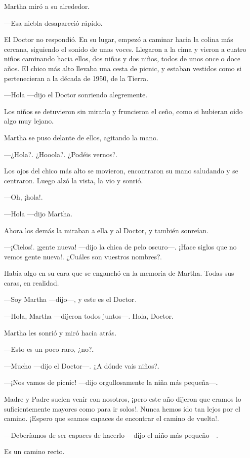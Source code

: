 Martha miró a su alrededor.

---Esa niebla desapareció rápido.

El Doctor no respondió. En su lugar, empezó a caminar hacia la colina más cercana, siguiendo el sonido de unas voces. Llegaron a la cima y vieron a cuatro niños caminando hacia ellos, dos niñas y dos niños, todos de unos once o doce años. El chico más alto llevaba una cesta de picnic, y estaban vestidos como si pertenecieran a la década de 1950, de la Tierra.

---Hola ---dijo el Doctor sonriendo alegremente.

Los niños se detuvieron sin mirarlo y fruncieron el ceño, como si hubieran oído algo muy lejano.

Martha se puso delante de ellos, agitando la mano.

---¿Hola?. ¿Hooola?. ¿Podéis vernos?.

Los ojos del chico más alto se movieron, encontraron su mano saludando y se centraron. Luego alzó la vista, la vio y sonrió.

---Oh, ¡hola!.

---Hola ---dijo Martha.

Ahora los demás la miraban a ella y al Doctor, y también sonreían.

---¡Cielos!. ¡gente nueva! ---dijo la chica de pelo oscuro---. ¡Hace siglos que no vemos gente nueva!. ¿Cuáles son vuestros nombres?.

Había algo en su cara que se enganchó en la memoria de Martha. Todas sus caras, en realidad.

---Soy Martha ---dijo---, y este es el Doctor.

---Hola, Martha ---dijeron todos juntos---. Hola, Doctor.

Martha les sonrió y miró hacia atrás.

---Esto es un poco raro, ¿no?.

---Mucho ---dijo el Doctor---. ¿A dónde vais niños?.

---¡Nos vamos de picnic! ---dijo orgullosamente la niña más pequeña---.

Madre y Padre suelen venir con nosotros, ¡pero este año dijeron que eramos lo suficientemente mayores como para ir solos!. Nunca hemos ido tan lejos por el camino. ¡Espero que seamos capaces de encontrar el camino de vuelta!.

---Deberíamos de ser capaces de hacerlo ---dijo el niño más pequeño---.

Es un camino recto.

